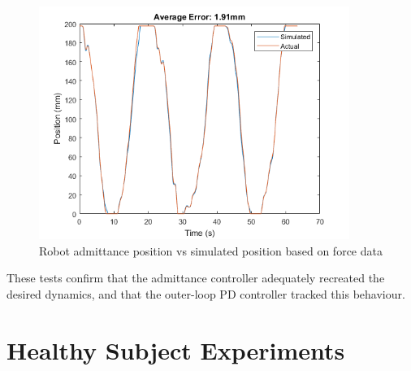 \documentclass[12pt]{report}
\begin{document}
\begin{figure}[h]
	\centering
	\includegraphics[width=0.9\textwidth]{admittance_sim}
	\caption{Robot admittance position vs simulated position based on force data}
	\label{fig:adm_sim}
\end{figure}	

	
		
	These tests confirm that the admittance controller adequately recreated the desired dynamics, and that the outer-loop PD controller tracked this behaviour. 
	
	
	
	
	\section{Healthy Subject Experiments}
	
\end{document}
